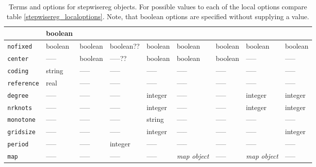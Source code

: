 \begin{sidewaystable}
\begin{tabular}{|l||p{1.5cm}|p{1.5cm}|p{1.5cm}|p{1.5cm}|p{2cm}|p{1.5cm}|p{2cm}|p{2.5cm}|}
                    & boolean \\
\hline
 {\tt nofixed}      & boolean & boolean          & boolean?? & boolean                       & boolean & boolean & boolean
                    & boolean \\
\hline
 {\tt center}       & -----   & boolean          & -----?? & boolean                       & boolean & boolean & -----
                    & ----- \\
\hline
 {\tt coding}       & string  & -----            & -----   & -----                         & -----   & -----   & -----
                    & ----- \\
\hline
 {\tt reference}    & real    & -----            & -----   & -----                         & -----   & -----   & -----
                    & ----- \\
\hline
 {\tt degree}       & -----   & -----            & -----   & integer                       & -----   & -----   & integer
                    & integer \\
\hline
 {\tt nrknots}      & -----   & -----            & -----   & integer                       & -----   & -----   & integer
                    & integer \\
\hline
 {\tt monotone}     & -----   & -----            & -----   & string                        & -----   & -----   & -----
                    & ----- \\
\hline
 {\tt gridsize}     & -----   & -----            & -----   & integer                       & -----   & -----   & -----
                    & integer \\
\hline
 {\tt period}       & -----   & -----            & integer & -----                         & -----   & -----   & -----
                    & ----- \\
\hline
 {\tt map}          & -----   & -----            & -----   & -----                         & {\it map object} & -----   & {\it map object}
                    & ----- \\
\hline
\end{tabular}
{\em\centering \caption{\label{termsoptions} Terms and options for
stepwisereg objects. For possible values to each of the local options compare table \ref{stepwisereg_localoptions}.
Note, that boolean options are specified without supplying a value.}}
\end{sidewaystable}



